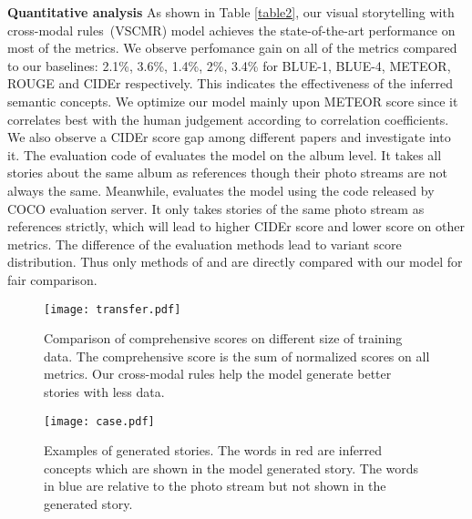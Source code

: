 \documentclass[sigconf]{acmart}
\begin{document}
\textbf{Quantitative analysis} As shown in Table \ref{table2}, our visual storytelling with cross-modal rules~(VSCMR) model achieves the state-of-the-art performance on most of the metrics. We observe perfomance gain on all of the metrics compared to our baselines: 2.1\%, 3.6\%, 1.4\%, 2\%, 3.4\% for BLUE-1, BLUE-4, METEOR, ROUGE and CIDEr respectively. This indicates the effectiveness of the inferred semantic concepts. We optimize our model mainly upon METEOR score since it correlates best with the human judgement according to correlation coefficients\cite{huang2016visual}. We also observe a CIDEr score gap among different papers and investigate into it. The evaluation code of \cite{yu2017hierarchically} evaluates the model on the album level. It takes all stories about the same album as references though their photo streams are not always the same. Meanwhile, \cite{Huang18} evaluates the model using the code released by COCO evaluation server. It only takes stories of the same photo stream as references strictly, which will lead to higher CIDEr score and lower score on other metrics. The difference of the evaluation methods lead to variant score distribution. Thus only methods of \cite{yu2017hierarchically} and \cite{wang2018no} are directly compared with our model for fair comparison. 

\begin{figure}[t] 
\centering 
\texttt{[image: transfer.pdf]}
\caption{Comparison of comprehensive scores on different size of training data. The comprehensive score is the sum of normalized scores on all metrics. Our cross-modal rules help the model generate better stories with less data.}
\label{figure7}
\end{figure}

\begin{figure*}[t] 
\centering 
\texttt{[image: case.pdf]} 
\caption{Examples of generated stories. The words in red are inferred concepts which are shown in the model generated story. The words in blue are relative to the photo stream but not shown in the generated story.}
\label{figure8}
\end{figure*}
\end{document}
